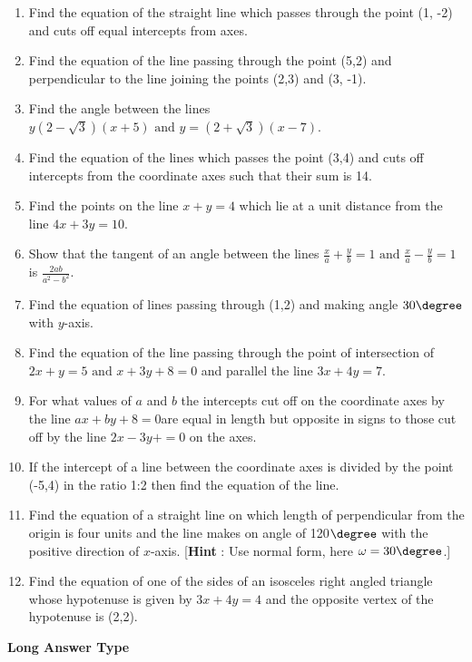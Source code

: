 
\begin{enumerate}[label=\thesection.\arabic*,ref=\thesection.\theenumi]
\item Find the equation of the straight line which passes through the point (1, -2) and cuts off equal intercepts from axes.
\item Find the equation of the line passing through the point (5,2) and perpendicular to the line joining the points (2,3) and (3, -1).
\item Find the angle between the lines $y(2-\sqrt{3})(x+5)\text{ and }y=(2+\sqrt{3})(x-7)$.
\item Find the equation of the lines which passes the point (3,4) and cuts off intercepts from the coordinate axes such that their sum is 14.
\item Find the points on the line $x+y=4$ which lie at a unit distance from the line $4x+3y=10$.
\item Show that the tangent of an angle between the lines $\frac{x}{a}+\frac{y}{b}=1 \text{ and }\frac{x}{a}-\frac{y}{b}=1$ is $\frac{2ab}{a^2-b^2}$.
\item Find the equation of lines passing through (1,2) and making angle $30\degree$ with $y$-axis.
\item Find the equation of the line passing through the point of intersection of $2x+y=5\text{ and }x+3y+8=0$ and parallel the line $3x+4y=7$.
\item For what values of $a$ and $b$ the intercepts cut off on the coordinate axes by the line $ax+by+8=0$are equal in length but opposite in signs to those cut off by the line $2x-3y+=0$ on the axes.
\item If the intercept of a line between the coordinate axes is divided by the point (-5,4) in the ratio 1:2 then find the equation of the line.
\item Find the equation of a straight line on which length of perpendicular from the origin is four units and the line makes on angle of 120$\degree$ with the positive direction of $x$-axis. [\textbf{Hint} : Use normal form, here $\omega =30\degree$.]
\item Find the equation of one of the sides of an isosceles right angled triangle whose hypotenuse is given by $3x+4y=4$ and the opposite vertex of the hypotenuse is (2,2).
\end{enumerate}
 \textbf{Long Answer Type}
